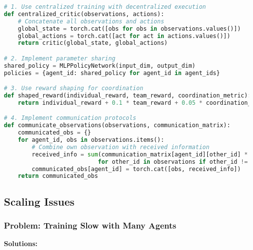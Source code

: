 \begin{lstlisting}[language=python, caption=Improve Coordination]
# 1. Use centralized training with decentralized execution
def centralized_critic(observations, actions):
    # Concatenate all observations and actions
    global_state = torch.cat([obs for obs in observations.values()])
    global_actions = torch.cat([act for act in actions.values()])
    return critic(global_state, global_actions)

# 2. Implement parameter sharing
shared_policy = MLPPolicyNetwork(input_dim, output_dim)
policies = {agent_id: shared_policy for agent_id in agent_ids}

# 3. Use reward shaping for coordination
def shaped_reward(individual_reward, team_reward, coordination_metric):
    return individual_reward + 0.1 * team_reward + 0.05 * coordination_metric

# 4. Implement communication protocols
def communicate_observations(observations, communication_matrix):
    communicated_obs = {}
    for agent_id, obs in observations.items():
        # Combine own observation with received information
        received_info = sum(communication_matrix[agent_id][other_id] * observations[other_id] 
                           for other_id in observations if other_id != agent_id)
        communicated_obs[agent_id] = torch.cat([obs, received_info])
    return communicated_obs
\end{lstlisting}

\subsection{Scaling Issues}

\subsubsection{Problem: Training Slow with Many Agents}

\textbf{Solutions:}

